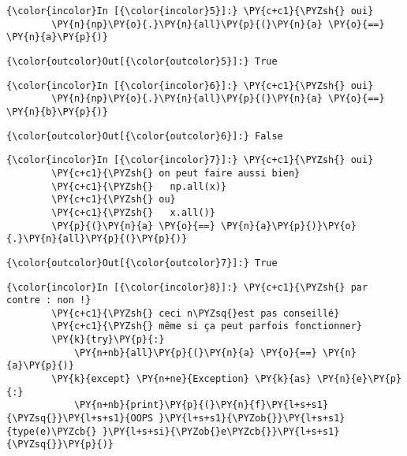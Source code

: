     \begin{Verbatim}[commandchars=\\\{\}]
{\color{incolor}In [{\color{incolor}5}]:} \PY{c+c1}{\PYZsh{} oui}
        \PY{n}{np}\PY{o}{.}\PY{n}{all}\PY{p}{(}\PY{n}{a} \PY{o}{==} \PY{n}{a}\PY{p}{)}
\end{Verbatim}


\begin{Verbatim}[commandchars=\\\{\}]
{\color{outcolor}Out[{\color{outcolor}5}]:} True
\end{Verbatim}
            
    \begin{Verbatim}[commandchars=\\\{\}]
{\color{incolor}In [{\color{incolor}6}]:} \PY{c+c1}{\PYZsh{} oui}
        \PY{n}{np}\PY{o}{.}\PY{n}{all}\PY{p}{(}\PY{n}{a} \PY{o}{==} \PY{n}{b}\PY{p}{)}
\end{Verbatim}


\begin{Verbatim}[commandchars=\\\{\}]
{\color{outcolor}Out[{\color{outcolor}6}]:} False
\end{Verbatim}
            
    \begin{Verbatim}[commandchars=\\\{\}]
{\color{incolor}In [{\color{incolor}7}]:} \PY{c+c1}{\PYZsh{} oui}
        \PY{c+c1}{\PYZsh{} on peut faire aussi bien}
        \PY{c+c1}{\PYZsh{}   np.all(x)}
        \PY{c+c1}{\PYZsh{} ou}
        \PY{c+c1}{\PYZsh{}   x.all()}
        \PY{p}{(}\PY{n}{a} \PY{o}{==} \PY{n}{a}\PY{p}{)}\PY{o}{.}\PY{n}{all}\PY{p}{(}\PY{p}{)}
\end{Verbatim}


\begin{Verbatim}[commandchars=\\\{\}]
{\color{outcolor}Out[{\color{outcolor}7}]:} True
\end{Verbatim}
            
    \begin{Verbatim}[commandchars=\\\{\}]
{\color{incolor}In [{\color{incolor}8}]:} \PY{c+c1}{\PYZsh{} par contre : non !}
        \PY{c+c1}{\PYZsh{} ceci n\PYZsq{}est pas conseillé}
        \PY{c+c1}{\PYZsh{} même si ça peut parfois fonctionner}
        \PY{k}{try}\PY{p}{:}
            \PY{n+nb}{all}\PY{p}{(}\PY{n}{a} \PY{o}{==} \PY{n}{a}\PY{p}{)}
        \PY{k}{except} \PY{n+ne}{Exception} \PY{k}{as} \PY{n}{e}\PY{p}{:}
            \PY{n+nb}{print}\PY{p}{(}\PY{n}{f}\PY{l+s+s1}{\PYZsq{}}\PY{l+s+s1}{OOPS }\PY{l+s+s1}{\PYZob{}}\PY{l+s+s1}{type(e)\PYZcb{} }\PY{l+s+si}{\PYZob{}e\PYZcb{}}\PY{l+s+s1}{\PYZsq{}}\PY{p}{)}
\end{Verbatim}


